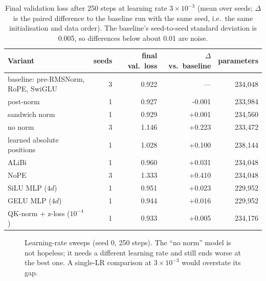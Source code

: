 \begin{table}[t]
\centering\small
\begin{tabular}{@{}lrrrr@{}}
\toprule
Variant & seeds & final val.\ loss & $\Delta$ vs.\ baseline & parameters\\
\midrule
baseline: pre-RMSNorm, RoPE, SwiGLU & 3 & 0.922 & --- & 234,048 \\
post-norm & 1 & 0.927 & -0.001 & 233,984 \\
sandwich norm & 1 & 0.929 & +0.001 & 234,560 \\
no norm & 3 & 1.146 & +0.223 & 233,472 \\
learned absolute positions & 1 & 1.028 & +0.100 & 238,144 \\
ALiBi & 1 & 0.960 & +0.031 & 234,048 \\
NoPE & 3 & 1.333 & +0.410 & 234,048 \\
SiLU MLP ($4d$) & 1 & 0.951 & +0.023 & 229,952 \\
GELU MLP ($4d$) & 1 & 0.944 & +0.016 & 229,952 \\
QK-norm + z-loss ($10^{-4}$) & 1 & 0.933 & +0.005 & 234,176 \\
\bottomrule
\end{tabular}
\caption{Final validation loss after 250 steps at learning rate $3\times10^{-3}$ (mean over seeds; $\Delta$ is the paired difference to the baseline run with the same seed, i.e.\ the same initialisation and data order). The
baseline's seed-to-seed standard deviation is 0.005, so differences below about 0.01 are noise.}
\label{tab:archdesign:results}
\end{table}

\begin{figure}[t]
\centering
{}
\caption{Learning-rate sweeps (seed 0, 250 steps). The ``no norm'' model is not hopeless; it needs a
different learning rate and still ends worse at the best one. A single-LR comparison at $3\times10^{-3}$
would overstate its gap.}
\label{fig:archdesign:lrsweep}
\end{figure}

